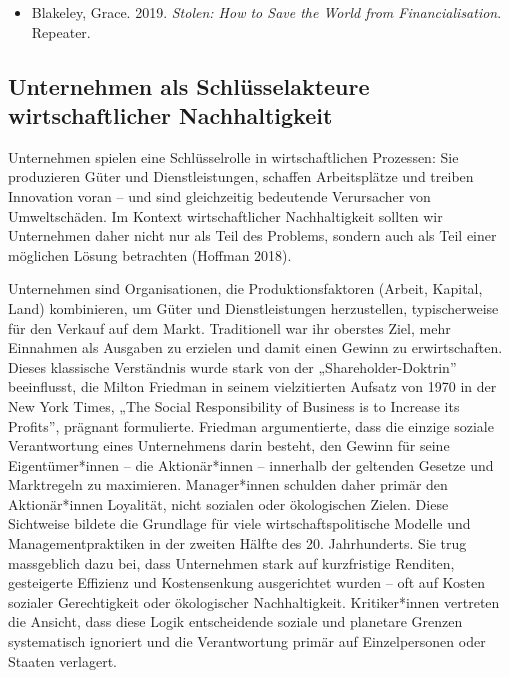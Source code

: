 \documentclass[
  nswissgerman,
  a4paper,
  openany]{book}
\providecommand{\tightlist}{%
  \setlength{\itemsep}{0pt}\setlength{\parskip}{0pt}}
\begin{document}
\begin{tcolorbox}[enhanced jigsaw, arc=.35mm, bottomrule=.15mm, bottomtitle=1mm, breakable, colback=white, colbacktitle=quarto-callout-caution-color!10!white, colframe=quarto-callout-caution-color-frame, coltitle=black, left=2mm, leftrule=.75mm, opacityback=0, opacitybacktitle=0.6, rightrule=.15mm, title={Weiterführende Literatur}, titlerule=0mm, toprule=.15mm, toptitle=1mm]

\begin{itemize}
\tightlist
\item
  Blakeley, Grace. 2019. \emph{Stolen: How to Save the World from
  Financialisation}. Repeater.
\end{itemize}

\end{tcolorbox}

\subsection{Unternehmen als Schlüsselakteure wirtschaftlicher
Nachhaltigkeit}\label{unternehmen-als-schluxfcsselakteure-wirtschaftlicher-nachhaltigkeit}

Unternehmen spielen eine Schlüsselrolle in wirtschaftlichen Prozessen:
Sie produzieren Güter und Dienstleistungen, schaffen Arbeitsplätze und
treiben Innovation voran -- und sind gleichzeitig bedeutende Verursacher
von Umweltschäden. Im Kontext wirtschaftlicher Nachhaltigkeit sollten
wir Unternehmen daher nicht nur als Teil des Problems, sondern auch als
Teil einer möglichen Lösung betrachten (Hoffman 2018).

Unternehmen sind Organisationen, die Produktionsfaktoren (Arbeit,
Kapital, Land) kombinieren, um Güter und Dienstleistungen herzustellen,
typischerweise für den Verkauf auf dem Markt. Traditionell war ihr
oberstes Ziel, mehr Einnahmen als Ausgaben zu erzielen und damit einen
Gewinn zu erwirtschaften. Dieses klassische Verständnis wurde stark von
der „Shareholder-Doktrin'' beeinflusst, die Milton Friedman in seinem
vielzitierten Aufsatz von 1970 in der New York Times, „The Social
Responsibility of Business is to Increase its Profits'', prägnant
formulierte. Friedman argumentierte, dass die einzige soziale
Verantwortung eines Unternehmens darin besteht, den Gewinn für seine
Eigentümer*innen -- die Aktionär*innen -- innerhalb der geltenden
Gesetze und Marktregeln zu maximieren. Manager*innen schulden daher
primär den Aktionär*innen Loyalität, nicht sozialen oder ökologischen
Zielen. Diese Sichtweise bildete die Grundlage für viele
wirtschaftspolitische Modelle und Managementpraktiken in der zweiten
Hälfte des 20. Jahrhunderts. Sie trug massgeblich dazu bei, dass
Unternehmen stark auf kurzfristige Renditen, gesteigerte Effizienz und
Kostensenkung ausgerichtet wurden -- oft auf Kosten sozialer
Gerechtigkeit oder ökologischer Nachhaltigkeit. Kritiker*innen vertreten
die Ansicht, dass diese Logik entscheidende soziale und planetare
Grenzen systematisch ignoriert und die Verantwortung primär auf
Einzelpersonen oder Staaten verlagert.
\end{document}
